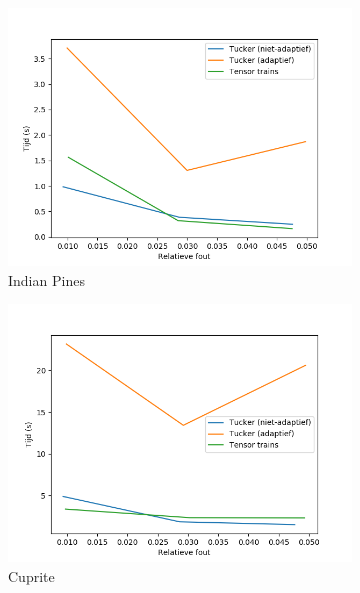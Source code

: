 \begin{figure}[]
\centering
\begin{subfigure}{0.48\textwidth}
  \centering
  \includegraphics[width=\linewidth]{images/tucker_vs_tensor_trains_times_Indian_Pines.png}
  \caption{Indian Pines}
\end{subfigure}
\begin{subfigure}{0.48\textwidth}
  \centering
  \includegraphics[width=\linewidth]{images/tucker_vs_tensor_trains_times_Cuprite.png}
  \caption{Cuprite}
\end{subfigure}
\\
\begin{subfigure}{0.48\textwidth}
  \centering

\end{subfigure}
\end{figure}

